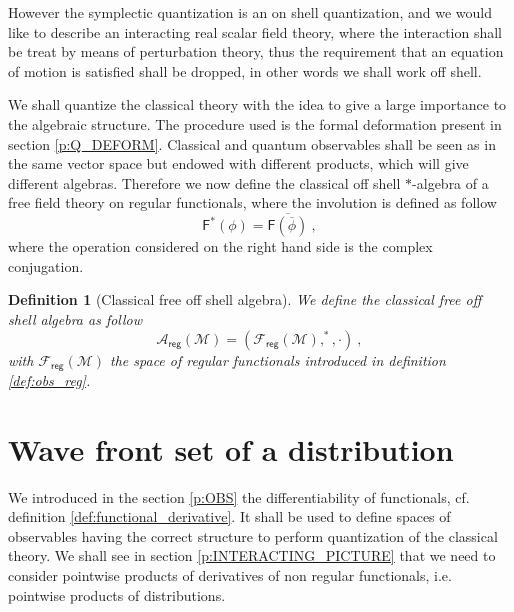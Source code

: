 \documentclass[11pt]{book}
\newcommand{\reg}{\mathsf{reg}}
\newcommand{\Acal}{\mathcal{A}}
\newcommand{\Fcal}{\mathcal{F}}
\newcommand{\Mcal}{\mathcal{M}}
\newcommand{\Fsf}{\mathsf{F}}
\theoremstyle{break}
\newtheorem{definition}{Definition}[chapter]
\begin{document}
However the symplectic quantization is an on shell quantization, and we would like to describe an interacting real scalar field theory, where the interaction shall be treat by means of perturbation theory, thus the requirement that an equation of motion is satisfied shall be dropped, in other words we shall work off shell. 


We shall quantize the classical theory with the idea to give a large importance to the algebraic structure. The procedure used is the formal deformation present in section \ref{p:Q_DEFORM}. Classical and quantum observables shall be seen as in the same vector space but endowed with different products, which will give different algebras. Therefore we now define the classical off shell $\ast$-algebra of a free field theory on regular functionals, where the involution is defined as follow
%
\begin{equation}
\Fsf^\ast(\phi) =  \overline{\Fsf(\overline{\phi})} \ , 
\label{eq:involution}
\end{equation}
%
where the operation considered on the right hand side is the complex conjugation. 


\begin{definition}[Classical free off shell algebra]\label{def:alg_clas}
We define the classical free off shell algebra as follow
%
\begin{equation}
\Acal_\reg(\Mcal) = \left(\Fcal_\reg(\Mcal), ^\ast , \cdot\right) \ ,
\label{eq:alg_clas}
\end{equation}
%
with $\Fcal_\reg(\Mcal)$ the space of regular functionals introduced in definition \ref{def:obs_reg}.
\end{definition}


\section{Wave front set of a distribution}


We introduced in the section \ref{p:OBS} the differentiability of functionals, cf. definition \ref{def:functional_derivative}. It shall be used to define spaces of observables having the correct structure to perform quantization of the classical theory. We shall see in section \ref{p:INTERACTING_PICTURE} that we need to consider pointwise products of derivatives of non regular functionals, i.e. pointwise products of distributions. 
\end{document}
